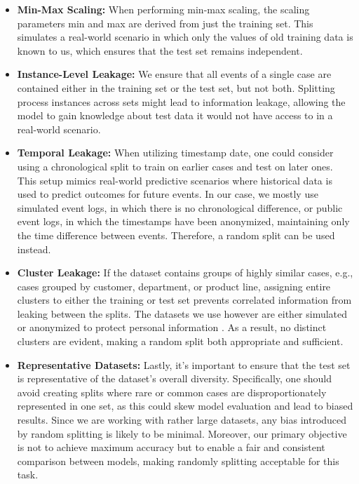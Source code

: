 \begin{itemize}
\item \textbf{Min-Max Scaling:}  
When performing min-max scaling,
the scaling parameters min and max are derived from just the training set.
This simulates a real-world scenario in which only the values of old training data is known to us,
which ensures that the test set remains independent.
\item \textbf{Instance-Level Leakage:}  
We ensure that all events of a single case are contained either in the training set or the test set, but not both.
Splitting process instances across sets might lead to information leakage,
allowing the model to gain knowledge about test data it would not have access to in a real-world scenario.
\item \textbf{Temporal Leakage:}  
When utilizing timestamp date, one could consider using a chronological split to train on earlier cases and test on later ones.
This setup mimics real-world predictive scenarios where historical data is used to predict outcomes for future events.
In our case, we mostly use simulated event logs, in which there is no chronological difference,
or public event logs, in which the timestamps have been anonymized,
maintaining only the time difference between events. \cite{hospital_billing}
Therefore, a random split can be used instead.
\item \textbf{Cluster Leakage:}  
If the dataset contains groups of highly similar cases, e.g., cases grouped by customer, department, or product line,
assigning entire clusters to either the training or test set prevents correlated information from leaking between the splits.
The datasets we use however are either simulated or anonymized to protect personal information \cite{hospital_billing}.
As a result, no distinct clusters are evident, making a random split both appropriate and sufficient.
\item \textbf{Representative Datasets:}  
Lastly, it's important to ensure that the test set is representative of the dataset's overall diversity.
Specifically, one should avoid creating splits where rare or common cases are disproportionately represented in one set,
as this could skew model evaluation and lead to biased results.
Since we are working with rather large datasets, any bias introduced by random splitting is likely to be minimal.
Moreover, our primary objective is not to achieve maximum accuracy but to enable a fair and consistent comparison between models,
making randomly splitting acceptable for this task.
\end{itemize}

